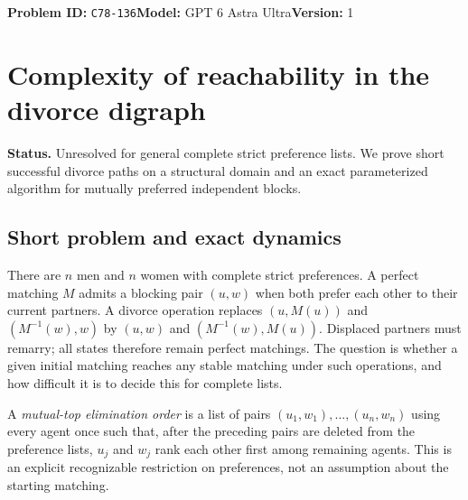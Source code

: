 \documentclass[11pt,a4paper]{article}
\begin{document}
\noindent\textbf{Problem ID:} \texttt{C78-136}\quad\textbf{Model:} GPT 6 Astra Ultra\quad\textbf{Version:} 1\par
\section*{Complexity of reachability in the divorce digraph}

\textbf{Status.} Unresolved for general complete strict preference lists. We prove short successful divorce paths on a structural domain and an exact parameterized algorithm for mutually preferred independent blocks.

\subsection*{Short problem and exact dynamics}
There are $n$ men and $n$ women with complete strict preferences. A perfect matching $M$ admits a blocking pair $(u,w)$ when both prefer each other to their current partners. A divorce operation replaces $(u,M(u))$ and $(M^{-1}(w),w)$ by $(u,w)$ and $(M^{-1}(w),M(u))$. Displaced partners must remarry; all states therefore remain perfect matchings. The question is whether a given initial matching reaches any stable matching under such operations, and how difficult it is to decide this for complete lists.

A \emph{mutual-top elimination order} is a list of pairs $(u_1,w_1),\ldots,(u_n,w_n)$ using every agent once such that, after the preceding pairs are deleted from the preference lists, $u_j$ and $w_j$ rank each other first among remaining agents. This is an explicit recognizable restriction on preferences, not an assumption about the starting matching.
\end{document}
